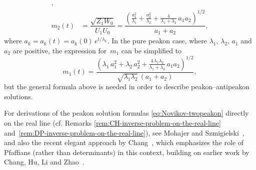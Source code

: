 \documentclass[10pt,a4paper]{article} \pdfoutput=1 
\begin{document}
\begin{example}
\begin{subequations}
\begin{equation}
\begin{split}
      , \\
      m_2(t)
      &
      = \dfrac{\sqrt{Z_1 W_0}}{U_1 U_0}
      = \dfrac{\left( \frac{a_1^2}{\lambda_1} + \frac{a_2^2}{\lambda_2} + \frac{4}{\lambda_1+\lambda_2} \, a_1 a_2 \right)^{1/2}}{a_1+a_2}
      ,
    \end{split}
  \end{equation}
  \end{subequations}
  where $a_k = a_k(t) = a_k(0) \, e^{t / \lambda_k}$.
  In the pure peakon case, where $\lambda_1$, $\lambda_2$, $a_1$ and~$a_2$ are positive,
  the expression for~$m_1$ can be simplified to
  \begin{equation*}
    m_1(t) = \frac{ \left( \lambda_1 \, a_1^2 + \lambda_2 \, a_2^2 + \frac{4 \, \lambda_1 \lambda_2}{\lambda_1+\lambda_2} \, a_1 a_2 \right)^{1/2}}{\sqrt{\lambda_1 \lambda_2} \, (a_1+a_2)}
    ,
  \end{equation*}
  but the general formula above is needed in order to describe peakon--antipeakon solutions.
\end{example}

\begin{remark}
  \label{rem:Novikov-inverse-problem-on-the-real-line}
  For derivations of the peakon solution formulas \eqref{eq:Novikov-twopeakon} directly on
  the real line (cf. Remarks \ref{rem:CH-inverse-problem-on-the-real-line}
  and~\ref{rem:DP-inverse-problem-on-the-real-line}),
  see Mohajer and Szmigielski~\cite{mohajer-szmigielski:2012:novikov-on-real-axis},
  and also the recent elegant approach by Chang~\cite{chang:2022:hermite-pade-pfaffian-structures-novikov-and-integrable-lattices},
  which emphasizes the role of Pfaffians (rather than determinants) in this context,
  building on earlier work by Chang, Hu, Li and Zhao~\cite{chang-hu-li-zhao:2018:novikov-peakons-pfaffians-Toda-lattice-BKP}.
\end{remark}
\end{document}
